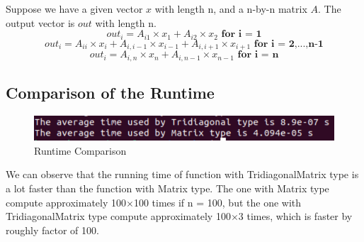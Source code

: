 \documentclass[10pt,a4paper]{article}
\begin{document}
Suppose we have a given vector $x$ with length n, and a n-by-n matrix $A$. The output vector is $out$ with length n.
\[
    out_{i} = A_{i1} \times x_{1} + A_{i2} \times x_{2} \textbf{ for i = 1}
\]
\[
    out_{i} = A_{ii} \times x_{i} + A_{i,i-1} \times x_{i-1} + A_{i,i+1} \times x_{i+1} \textbf{ for i = 2,...,n-1}
\]
\[
     out_{i} = A_{i,n} \times x_{n} + A_{i,n-1} \times x_{n-1} \textbf{ for i = n}
\]


\subsection{Comparison of the Runtime}
\begin{figure}[!ht]
        \centering \includegraphics[scale=1]{figures/tridiagonal runtime.png}
        \caption{Runtime Comparison}
\end{figure}

We can observe that the running time of function with TridiagonalMatrix type is a lot faster than the function with Matrix type. The one with Matrix type compute approximately 100$\times$100 times if n = 100, but the one with TridiagonalMatrix type compute approximately 100$\times$3 times, which is faster by roughly factor of 100. 
\end{document}

